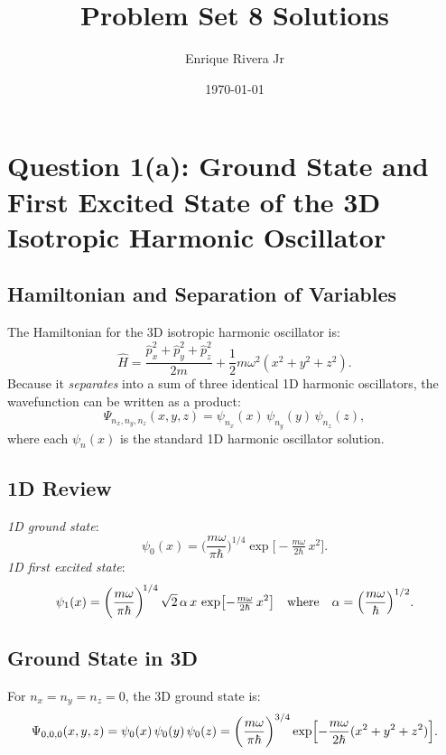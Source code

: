 \documentclass[12pt]{article}
\begin{document}
\title{Problem Set 8 Solutions}
\author{Enrique Rivera Jr}
\date{\today}

\maketitle



\section*{Question 1(a): Ground State and First Excited State of the 3D Isotropic Harmonic Oscillator}
\subsection*{Hamiltonian and Separation of Variables}
\noindent
The Hamiltonian for the 3D isotropic harmonic oscillator is:
\begin{equation}
\hat{H} = \frac{\hat{p}_x^2 + \hat{p}_y^2 + \hat{p}_z^2}{2m} + \frac{1}{2}m\omega^2 (x^2 + y^2 + z^2).
\end{equation}
Because it \emph{separates} into a sum of three identical 1D harmonic oscillators, the wavefunction can be written as a product:
\begin{equation}
\Psi_{n_x,n_y,n_z}(x,y,z) = \psi_{n_x}(x)\,\psi_{n_y}(y)\,\psi_{n_z}(z),
\end{equation}
where each \(\psi_{n}(x)\) is the standard 1D harmonic oscillator solution.

\subsection*{1D Review}
\noindent\emph{1D ground state}:\quad
\begin{equation}
\psi_{0}(x) = \biggl(\frac{m\omega}{\pi\hbar}\biggr)^{\!1/4}\exp\bigl[-\tfrac{m\omega}{2\hbar}\,x^2\bigr].
\end{equation}
\noindent\emph{1D first excited state}:\quad
\begin{equation}
\psi_{1}(x) = \biggl(\frac{m\omega}{\pi\hbar}\biggr)^{\!1/4}\,\sqrt{2}\,\alpha\,x\,\exp\bigl[-\tfrac{m\omega}{2\hbar}\,x^2\bigr]\quad\text{where}\quad\alpha = \Bigl(\frac{m\omega}{\hbar}\Bigr)^{1/2}.
\end{equation}

\subsection*{Ground State in 3D}
\noindent
For \(n_x=n_y=n_z=0\), the 3D ground state is:
\begin{equation}
\Psi_{0,0,0}(x,y,z) = \psi_0(x)\,\psi_0(y)\,\psi_0(z)
= \biggl(\frac{m\omega}{\pi\hbar}\biggr)^{3/4}\exp\Bigl[-\frac{m\omega}{2\hbar}(x^2 + y^2 + z^2)\Bigr].
\end{equation}
\end{document}
